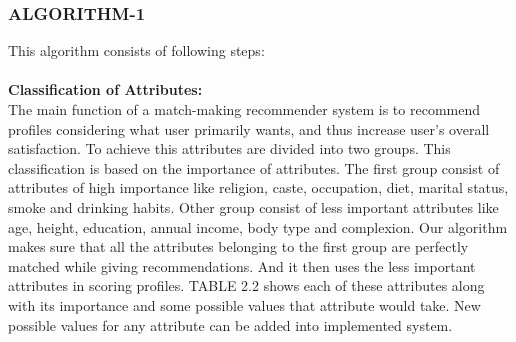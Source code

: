\documentclass[12pt,oneside]{book}
\begin{document}
\subsubsection{ALGORITHM-\textbf{1}}
This algorithm consists of following steps:\\\\
\textbf{Classification of Attributes:}\\
The main function of a match-making recommender system is to recommend profiles considering what user primarily wants, and thus increase user's overall satisfaction. To achieve this attributes are divided into two groups. This classification is based on the importance of attributes. The first group consist of attributes of high importance like religion, caste, occupation, diet, marital status, smoke and drinking habits. Other group consist of less important attributes like age, height, education, annual income, body type and complexion. Our algorithm makes sure that all the attributes belonging to the first group are perfectly matched while giving recommendations. And it then uses the less important attributes in scoring profiles. TABLE 2.2 shows each of these attributes along with its importance and some possible values that attribute would take. New possible values for any attribute can be added into implemented system.
\end{document}
